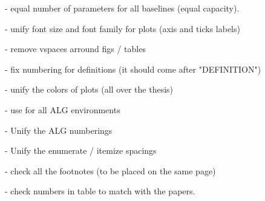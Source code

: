  - equal number of parameters for all baselines (equal capacity).

 - unify font size and font family for plots (axis and ticks labels)

 - remove vspaces arround figs / tables
 
 - fix numbering for definitions (it should come after "DEFINITION")
 
 - unify the colors of plots (all over the thesis)
 
 - use \small for all ALG environments
 
 - Unify the ALG numberings
 
 - Unify the enumerate / itemize spacings
 
 - check all the footnotes (to be placed on the same page)
 
 - check numbers in table to match with the papers.